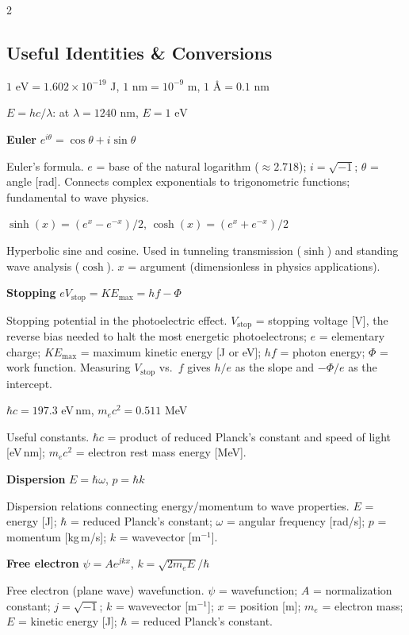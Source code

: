\documentclass[9pt]{extarticle}
\newcommand{\eqlabel}[1]{\textbf{\scriptsize #1}\;}
\newcommand{\desc}[1]{{\small\color{desc}#1}}
\begin{document}
\begin{multicols}{2}
\subsection{Useful Identities \& Conversions}
$1\text{ eV} = 1.602\times10^{-19}$ J, \; $1\text{ nm} = 10^{-9}$ m, \; $1\text{ \AA} = 0.1\text{ nm}$

$E = hc/\lambda$: at $\lambda = 1240\text{ nm}$, $E = 1\text{ eV}$

\eqlabel{Euler} $e^{i\theta} = \cos\theta + i\sin\theta$

\desc{Euler's formula. $e$ = base of the natural logarithm ($\approx 2.718$); $i = \sqrt{-1}$; $\theta$ = angle [rad]. Connects complex exponentials to trigonometric functions; fundamental to wave physics.}

$\sinh(x) = (e^x - e^{-x})/2$, \; $\cosh(x) = (e^x + e^{-x})/2$

\desc{Hyperbolic sine and cosine. Used in tunneling transmission ($\sinh$) and standing wave analysis ($\cosh$). $x$ = argument (dimensionless in physics applications).}

\eqlabel{Stopping} $eV_{\text{stop}} = KE_{\max} = hf - \Phi$

\desc{Stopping potential in the photoelectric effect. $V_{\text{stop}}$ = stopping voltage [V], the reverse bias needed to halt the most energetic photoelectrons; $e$ = elementary charge; $KE_{\max}$ = maximum kinetic energy [J or eV]; $hf$ = photon energy; $\Phi$ = work function. Measuring $V_{\text{stop}}$ vs.\ $f$ gives $h/e$ as the slope and $-\Phi/e$ as the intercept.}

$\hbar c = 197.3$ eV\,nm, \; $m_ec^2 = 0.511$ MeV

\desc{Useful constants. $\hbar c$ = product of reduced Planck's constant and speed of light [eV\,nm]; $m_ec^2$ = electron rest mass energy [MeV].}

\eqlabel{Dispersion} $E = \hbar\omega$, $p = \hbar k$

\desc{Dispersion relations connecting energy/momentum to wave properties. $E$ = energy [J]; $\hbar$ = reduced Planck's constant; $\omega$ = angular frequency [rad/s]; $p$ = momentum [kg\,m/s]; $k$ = wavevector [m$^{-1}$].}

\eqlabel{Free electron} $\psi = Ae^{jkx}$, $k = \sqrt{2m_eE}/\hbar$

\desc{Free electron (plane wave) wavefunction. $\psi$ = wavefunction; $A$ = normalization constant; $j = \sqrt{-1}$; $k$ = wavevector [m$^{-1}$]; $x$ = position [m]; $m_e$ = electron mass; $E$ = kinetic energy [J]; $\hbar$ = reduced Planck's constant.}


\end{multicols}
\end{document}

